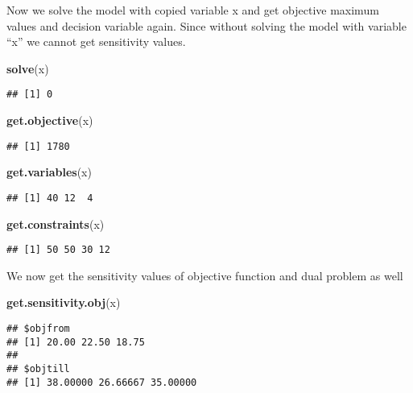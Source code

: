 \documentclass[
]{article}
\newenvironment{Shaded}{\begin{snugshade}}{\end{snugshade}}
\newcommand{\FunctionTok}[1]{\textcolor[rgb]{0.13,0.29,0.53}{\textbf{#1}}}
\newcommand{\NormalTok}[1]{#1}
\begin{document}
Now we solve the model with copied variable x and get objective maximum
values and decision variable again. Since without solving the model with
variable ``x'' we cannot get sensitivity values.

\begin{Shaded}
\begin{Highlighting}[]
\FunctionTok{solve}\NormalTok{(x)}
\end{Highlighting}
\end{Shaded}

\begin{verbatim}
## [1] 0
\end{verbatim}

\begin{Shaded}
\begin{Highlighting}[]
\FunctionTok{get.objective}\NormalTok{(x)}
\end{Highlighting}
\end{Shaded}

\begin{verbatim}
## [1] 1780
\end{verbatim}

\begin{Shaded}
\begin{Highlighting}[]
\FunctionTok{get.variables}\NormalTok{(x)}
\end{Highlighting}
\end{Shaded}

\begin{verbatim}
## [1] 40 12  4
\end{verbatim}

\begin{Shaded}
\begin{Highlighting}[]
\FunctionTok{get.constraints}\NormalTok{(x)}
\end{Highlighting}
\end{Shaded}

\begin{verbatim}
## [1] 50 50 30 12
\end{verbatim}

We now get the sensitivity values of objective function and dual problem
as well

\begin{Shaded}
\begin{Highlighting}[]
\FunctionTok{get.sensitivity.obj}\NormalTok{(x)}
\end{Highlighting}
\end{Shaded}

\begin{verbatim}
## $objfrom
## [1] 20.00 22.50 18.75
## 
## $objtill
## [1] 38.00000 26.66667 35.00000
\end{verbatim}
\end{document}

